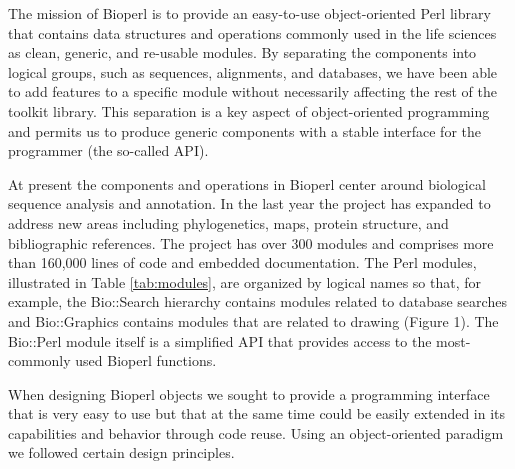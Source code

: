 \documentclass[12pt]{article}
\begin{document}
The mission of Bioperl is to provide an easy-to-use object-oriented
Perl library that contains data structures and operations commonly
used in the life sciences as clean, generic, and re-usable modules.
By separating the components into logical groups, such as sequences,
alignments, and databases, we have been able to add features to a
specific module without necessarily affecting the rest of the toolkit
library.  This separation is a key aspect of object-oriented
programming and permits us to produce generic components with a stable
interface for the programmer (the so-called API).  

At present the components and operations in Bioperl center around
biological sequence analysis and annotation.  In the last year the
project has expanded to address new areas including phylogenetics,
maps, protein structure, and bibliographic references.  The project
has over 300 modules and comprises more than 160,000 lines of code and
embedded documentation.  The Perl modules, illustrated in Table
\ref{tab:modules}, are organized by logical names so that, for example,
the Bio::Search hierarchy contains modules related to database
searches and Bio::Graphics contains modules that are related to
drawing (Figure 1).  The Bio::Perl module itself
is a simplified API that provides access to the most-commonly used 
Bioperl functions.

When designing Bioperl objects we sought to provide a
programming interface that is very easy to use but that at the same
time could be easily extended in its capabilities and behavior through
code reuse.  Using an object-oriented paradigm we followed certain
design principles.
\end{document}
